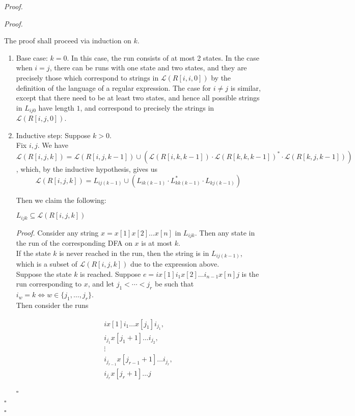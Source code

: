 \documentclass[a4paper]{article}
\newenvironment{proof}{\begin{breakbox}\textit{Proof.}}{\hfill$\square$\end{breakbox}}
\newcommand{\mc}{\mathcal}
\renewcommand{\L}{\mc{L}}
\begin{document}
\begin{proof}
	\begin{proof}

		The proof shall proceed via induction on $k$.

		\begin{enumerate}

			\item Base case: $k = 0$. In this case, the run consists of at most 2 states. In the case when $i = j$, there can be runs with one state and two states, and they are precisely those
			      which correspond to strings in $\L(R[i, i, 0])$ by the definition of the language of a regular expression. The case for $i \ne j$ is similar, except that there need to be at
			      least two states, and hence all possible strings in $L_{ij0}$ have length $1$, and correspond to precisely the strings in $\L(R[i, j, 0])$.

			\item Inductive step: Suppose $k > 0$.\\

			      Fix $i, j$. We have $\L(R[i, j, k]) = \L(R[i, j, k - 1]) \cup (\L(R[i, k, k - 1]) \cdot \L(R[k, k, k - 1])^* \cdot \L(R[k, j, k - 1]))$, which, by the inductive hypothesis, gives us
			      $$\L(R[i, j, k]) = L_{ij(k-1)} \cup (L_{ik(k-1)} \cdot L_{kk(k-1)}^* \cdot L_{kj(k-1)})$$

			      Then we claim the following:\\

			      \begin{claim}
				      $L_{ijk} \subseteq \L(R[i, j, k])$
			      \end{claim}
			      \begin{proof}
				      Consider any string $x = x[1] x[2] \ldots x[n]$ in $L_{ijk}$. Then any state in the run of the corresponding DFA on $x$ is at most $k$.\\

				      If the state $k$ is never reached in the run, then the string is in $L_{ij(k-1)}$, which is a subset of $\L(R[i, j, k])$ due to the expression above.\\

				      Suppose the state $k$ is reached. Suppose $e = i x[1] i_1 x[2] \ldots i_{n-1} x[n] j$ is the run corresponding to $x$,
				      and let $j_1 < \cdots < j_r$ be such that $i_w = k \iff w \in \{j_1, \ldots, j_r\}$.\\

				      Then consider the runs

				      \begin{align*}
					      i x[1] i_1 \ldots x[j_1] i_{j_1},        \\
					      i_{j_1} x[j_1 + 1] \ldots i_{j_2},       \\
					      \vdots                                   \\
					      i_{j_{r-1}} x[j_{r-1}+1] \ldots i_{j_r}, \\
					      i_{j_r} x[j_r + 1] \ldots j              \\
				      \end{align*}


\end{proof}
\end{enumerate}
\end{proof}
\end{proof}
\end{document}
